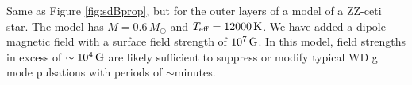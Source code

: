 \label{fig:WDProp}
Same as Figure \ref{fig:sdBprop}, but for the outer layers of a model of a ZZ-ceti star. The model has $M=0.6\,M_\odot$ and $T_{\rm eff} = 12000 \, {\rm K}$. We have added a dipole magnetic field with a surface field strength of $10^7 \, {\rm G}$. In this model, field strengths in excess of $\sim 10^4 \, {\rm G}$ are likely sufficient to suppress or modify typical WD g mode pulsations with periods of $\sim$minutes.